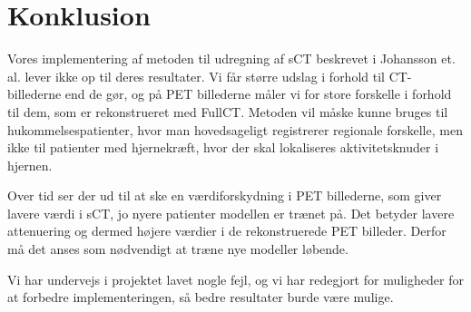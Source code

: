 \section{Konklusion}

Vores implementering af metoden til udregning af sCT beskrevet i Johansson
et. al. lever ikke op til deres resultater. Vi får større udslag i forhold
til CT-billederne end de gør, og på PET billederne måler vi for store
forskelle i forhold til dem, som er rekonstrueret med FullCT.  Metoden vil
måske kunne bruges til hukommelsespatienter, hvor man hovedsageligt
registrerer regionale forskelle, men ikke til patienter med hjernekræft,
hvor der skal lokaliseres aktivitetsknuder i hjernen.

Over tid ser der ud til at ske en værdiforskydning i PET billederne, som
giver lavere værdi i sCT, jo nyere patienter modellen er trænet på. Det
betyder lavere attenuering og dermed højere værdier i de rekonstruerede
PET billeder. Derfor må det anses som nødvendigt at træne nye modeller
løbende.

Vi har undervejs i projektet lavet nogle fejl, og vi har redegjort for
muligheder for at forbedre implementeringen, så bedre resultater burde
være mulige.



